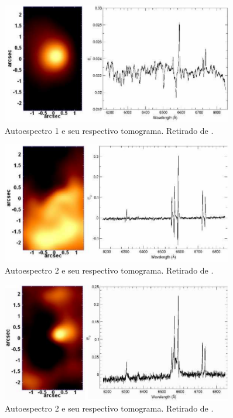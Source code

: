 \begin{figure}
    \includegraphics[width=0.9\textwidth]{figuras/figSteiner2009figA1.pdf}
    \caption[Tomograma e autoespectro 1 da galáxia NGC 4736.]
    {Autoespectro 1 e seu respectivo tomograma. Retirado de \citet[][fig.
    A1]{Steiner2009}.}
    \label{fig:TomoPCA:eigspec1}
\end{figure}

\begin{figure}
    \includegraphics[width=0.9\textwidth]{figuras/figSteiner2009figA2.pdf}
    \caption[Tomograma e autoespectro 2 da galáxia NGC 4736.]
    {Autoespectro 2 e seu respectivo tomograma. Retirado de \citet[][fig.
    A2]{Steiner2009}.}
    \label{fig:TomoPCA:eigspec2}
\end{figure}

\begin{figure}
    \includegraphics[width=0.9\textwidth]{figuras/figSteiner2009figA3.pdf}
    \caption[Tomograma e autoespectro 3 da galáxia NGC 4736.]
    {Autoespectro 2 e seu respectivo tomograma. Retirado de \citet[][fig.
    A3]{Steiner2009}.}
    \label{fig:TomoPCA:eigspec3}
\end{figure}

